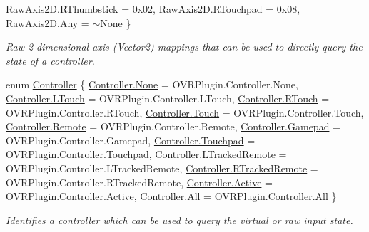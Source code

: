 \begin{DoxyCompactItemize}
\mbox{\hyperlink{class_o_v_r_input_a973c161bfb3bd6d0cc16c3a0b56c9f4aa143ae6547eaed39d27d96f4bd1a57df7}{Raw\+Axis2\+D.\+R\+Thumbstick}} = 0x02, 
\newline
\mbox{\hyperlink{class_o_v_r_input_a973c161bfb3bd6d0cc16c3a0b56c9f4aa589550297d0b2ddda9f8bc62fcb2060e}{Raw\+Axis2\+D.\+R\+Touchpad}} = 0x08, 
\mbox{\hyperlink{class_o_v_r_input_a973c161bfb3bd6d0cc16c3a0b56c9f4aaed36a1ef76a59ee3f15180e0441188ad}{Raw\+Axis2\+D.\+Any}} = $\sim$\+None
 \}
\begin{DoxyCompactList}\small\item\em Raw 2-\/dimensional axis (Vector2) mappings that can be used to directly query the state of a controller. \end{DoxyCompactList}\item 
enum \mbox{\hyperlink{class_o_v_r_input_a5c86f9052a9cbb0b73779ff5704d60a8}{Controller}} \{ \newline
\mbox{\hyperlink{class_o_v_r_input_a5c86f9052a9cbb0b73779ff5704d60a8a6adf97f83acf6453d4a6a4b1070f3754}{Controller.\+None}} = O\+V\+R\+Plugin.\+Controller.\+None, 
\mbox{\hyperlink{class_o_v_r_input_a5c86f9052a9cbb0b73779ff5704d60a8a253c104ad721758c8c0654a6878f47ff}{Controller.\+L\+Touch}} = O\+V\+R\+Plugin.\+Controller.\+L\+Touch, 
\mbox{\hyperlink{class_o_v_r_input_a5c86f9052a9cbb0b73779ff5704d60a8a02f85d6ee062327d58a289335f56fca1}{Controller.\+R\+Touch}} = O\+V\+R\+Plugin.\+Controller.\+R\+Touch, 
\mbox{\hyperlink{class_o_v_r_input_a5c86f9052a9cbb0b73779ff5704d60a8af0f31c9700c6b10d8a20dc487b2ae6a8}{Controller.\+Touch}} = O\+V\+R\+Plugin.\+Controller.\+Touch, 
\newline
\mbox{\hyperlink{class_o_v_r_input_a5c86f9052a9cbb0b73779ff5704d60a8af8508f576cd3f742dfc268258dcdf0dd}{Controller.\+Remote}} = O\+V\+R\+Plugin.\+Controller.\+Remote, 
\mbox{\hyperlink{class_o_v_r_input_a5c86f9052a9cbb0b73779ff5704d60a8a221f6781b4faa2d321ca0d928f518d6e}{Controller.\+Gamepad}} = O\+V\+R\+Plugin.\+Controller.\+Gamepad, 
\mbox{\hyperlink{class_o_v_r_input_a5c86f9052a9cbb0b73779ff5704d60a8a8229bf08d472e129beff22e3984afdbd}{Controller.\+Touchpad}} = O\+V\+R\+Plugin.\+Controller.\+Touchpad, 
\mbox{\hyperlink{class_o_v_r_input_a5c86f9052a9cbb0b73779ff5704d60a8aa184aebbab0392c84449b5608c3018b7}{Controller.\+L\+Tracked\+Remote}} = O\+V\+R\+Plugin.\+Controller.\+L\+Tracked\+Remote, 
\newline
\mbox{\hyperlink{class_o_v_r_input_a5c86f9052a9cbb0b73779ff5704d60a8a340397b86dde531ed77fa1b55f87f181}{Controller.\+R\+Tracked\+Remote}} = O\+V\+R\+Plugin.\+Controller.\+R\+Tracked\+Remote, 
\mbox{\hyperlink{class_o_v_r_input_a5c86f9052a9cbb0b73779ff5704d60a8a4d3d769b812b6faa6b76e1a8abaece2d}{Controller.\+Active}} = O\+V\+R\+Plugin.\+Controller.\+Active, 
\mbox{\hyperlink{class_o_v_r_input_a5c86f9052a9cbb0b73779ff5704d60a8ab1c94ca2fbc3e78fc30069c8d0f01680}{Controller.\+All}} = O\+V\+R\+Plugin.\+Controller.\+All
 \}
\begin{DoxyCompactList}\small\item\em Identifies a controller which can be used to query the virtual or raw input state. \end{DoxyCompactList}\end{DoxyCompactItemize}
